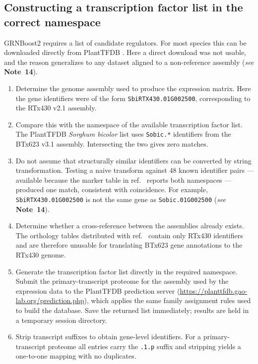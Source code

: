 \documentclass[11pt,a4paper]{article}
\newcommand{\seenote}[1]{(\textit{see} \textbf{Note~#1})}
\begin{document}
\subsection{Constructing a transcription factor list in the correct namespace}

GRNBoost2 requires a list of candidate regulators. For most species this can be downloaded directly from PlantTFDB \cite{tian2020,jin2017}. Here a direct download was not usable, and the reason generalizes to any dataset aligned to a non-reference assembly \seenote{14}.

\begin{enumerate}[leftmargin=*]
\item Determine the genome assembly used to produce the expression matrix. Here the gene identifiers were of the form \texttt{SbiRTX430.01G002500}, corresponding to the RTx430 v2.1 assembly.

\item Compare this with the namespace of the available transcription factor list. The PlantTFDB \textit{Sorghum bicolor} list uses \texttt{Sobic.*} identifiers from the BTx623 v3.1 assembly. Intersecting the two gives zero matches.

\item Do not assume that structurally similar identifiers can be converted by string transformation. Testing a naive transform against 48 known identifier pairs --- available because the marker table in ref.~\cite{baumgart2025} reports both namespaces --- produced one match, consistent with coincidence. For example, \texttt{SbiRTX430.01G002500} is not the same gene as \texttt{Sobic.01G002500} \seenote{14}.

\item Determine whether a cross-reference between the assemblies already exists. The orthology tables distributed with ref.~\cite{baumgart2025} contain only RTx430 identifiers and are therefore unusable for translating BTx623 gene annotations to the RTx430 genome.

\item Generate the transcription factor list directly in the required namespace. Submit the primary-transcript proteome for the assembly used by the expression data to the PlantTFDB prediction server (\url{https://planttfdb.gao-lab.org/prediction.php}), which applies the same family assignment rules used to build the database. Save the returned list immediately; results are held in a temporary session directory.

\item Strip transcript suffixes to obtain gene-level identifiers. For a primary-transcript proteome all entries carry the \texttt{.1.p} suffix and stripping yields a one-to-one mapping with no duplicates.
\end{enumerate}
\end{document}
